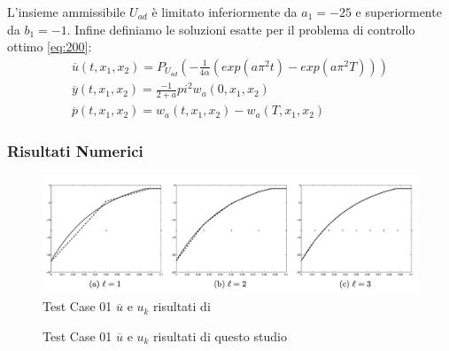 L'insieme ammissibile $U_{ad}$ è limitato inferiormente da $a_1=-25$ e superiormente da $b_1=-1$.
Infine definiamo le soluzioni esatte per il problema di controllo ottimo \ref{eq:200}:
{\renewcommand\arraystretch{2}
\begin{equation}
\begin{array}{c}
\overline{u}(t,x_1,x_2) = P_{U_{ad}} \left( -\frac{1}{4\alpha}(exp(a{\pi}^2t)-exp(a{\pi}^2T)) \right) \\
\overline{y}(t,x_1,x_2) = \frac{- 1}{2 + a}{pi}^2w_a(0,x_1,x_2) \\
\overline{p}(t,x_1,x_2) = w_a(t,x_1,x_2) - w_a(T,x_1,x_2)
\end{array}
\label{eq:504}
\end{equation}
}

\subsubsection{Risultati Numerici}
\begin{figure}
\centering
\includegraphics[width=\linewidth]{img/cap6/TestCase01_ues_paper}
\caption{Test Case 01 $\overline{u}$ e $u_k$ risultati di \cite{MAIN}}
\label{fig:500}
\end{figure}

\begin{figure}
\centering%
\qquad
{}\qquad
{}
\caption{Test Case 01 $\overline{u}$ e $u_k$ risultati di questo studio\label{fig:501}}
\end{figure}


